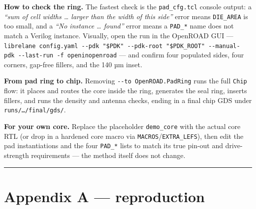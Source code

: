\documentclass[
  11pt,
  a4paper,
]{article}
\newenvironment{Shaded}{}{}
\newcommand{\NormalTok}[1]{#1}
\begin{document}
\textbf{How to check the ring.} The fastest check is the
\texttt{pad\_cfg.tcl} console output: a \emph{``sum of cell widths
\ldots{} larger than the width of this side''} error means
\texttt{DIE\_AREA} is too small, and a \emph{``No instance \ldots{}
found''} error means a \texttt{PAD\_*} name does not match a Verilog
instance. Visually, open the run in the OpenROAD GUI ---
\texttt{librelane\ config.yaml\ -\/-pdk\ "\$PDK"\ -\/-pdk-root\ "\$PDK\_ROOT"\ -\/-manual-pdk\ -\/-last-run\ -f\ openinopenroad}
--- and confirm four populated sides, four corners, gap-free fillers,
and the 140 µm inset.

\textbf{From pad ring to chip.} Removing
\texttt{-\/-to\ OpenROAD.PadRing} runs the full \texttt{Chip} flow: it
places and routes the core inside the ring, generates the seal ring,
inserts fillers, and runs the density and antenna checks, ending in a
final chip GDS under \texttt{runs/…/final/gds/}.

\textbf{For your own core.} Replace the placeholder \texttt{demo\_core}
with the actual core RTL (or drop in a hardened core macro via
\texttt{MACROS}/\texttt{EXTRA\_LEFS}), then edit the pad instantiations
and the four \texttt{PAD\_*} lists to match its true pin-out and
drive-strength requirements --- the method itself does not change.

\begin{center}\rule{0.5\linewidth}{0.5pt}\end{center}

\hypertarget{appendix-a-reproduction}{%
\section{Appendix A --- reproduction}\label{appendix-a-reproduction}}

\begin{Shaded}
\end{Shaded}
\end{document}
